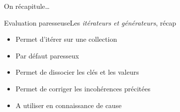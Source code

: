 \begin{frameC}{On récapitule\ldots}

\end{frameC}

\begin{frame}{Evaluation paresseuse}{Les \textit{itérateurs et générateurs}, récap}
    \begin{itemize}[<+->]
        \item Permet d'itérer sur une collection

        \item Par défaut paresseux

        \item Permet de dissocier les clés et les valeurs

        \item Permet de corriger les incohérences précitées

        \item A utiliser en connaissance de cause
    \end{itemize}
\end{frame}
